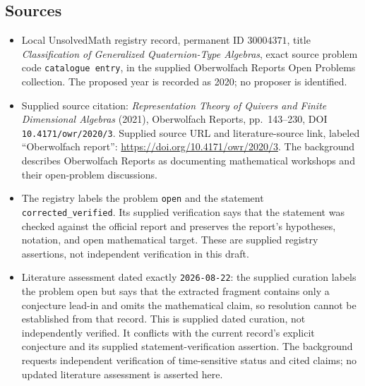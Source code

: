 \documentclass[11pt]{article}
\begin{document}
\subsection{Sources}
\begin{itemize}
\item Local UnsolvedMath registry record, permanent ID \(30004371\), title \emph{Classification of Generalized Quaternion-Type Algebras}, exact source problem code \texttt{catalogue entry}, in the supplied Oberwolfach Reports Open Problems collection. The proposed year is recorded as 2020; no proposer is identified.
\item Supplied source citation: \emph{Representation Theory of Quivers and Finite Dimensional Algebras} (2021), Oberwolfach Reports, pp.\ 143--230, DOI \texttt{10.4171/owr/2020/3}. Supplied source URL and literature-source link, labeled ``Oberwolfach report'': \url{https://doi.org/10.4171/owr/2020/3}. The background describes Oberwolfach Reports as documenting mathematical workshops and their open-problem discussions.
\item The registry labels the problem \texttt{open} and the statement \texttt{corrected\_verified}. Its supplied verification says that the statement was checked against the official report and preserves the report's hypotheses, notation, and open mathematical target. These are supplied registry assertions, not independent verification in this draft.
\item Literature assessment dated exactly \texttt{2026-08-22}: the supplied curation labels the problem open but says that the extracted fragment contains only a conjecture lead-in and omits the mathematical claim, so resolution cannot be established from that record. This is supplied dated curation, not independently verified. It conflicts with the current record's explicit conjecture and its supplied statement-verification assertion. The background requests independent verification of time-sensitive status and cited claims; no updated literature assessment is asserted here.
\end{itemize}
\end{document}
